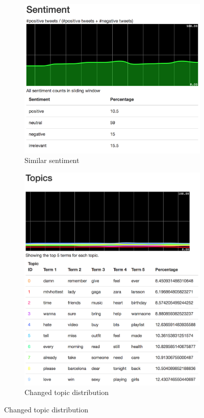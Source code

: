 \begin{figure}
    \centering
    \caption{Sample stream comparison to sample dataset}
    \label{fig:dasboard_sample}
    \begin{subfigure}[t]{0.485\textwidth}
        \centering
        \caption{Similar sentiment}
        \label{fig:sample_sentiment_distribtion_new}
        \includegraphics[width=\textwidth]{../images/dashboard_sentiment_sample.png}
    \end{subfigure}
    \begin{subfigure}[t]{0.505\textwidth}
        \centering
        \caption{Changed topic distribution}
        \label{fig:sample_topic_distribution_new}
        \includegraphics[width=\textwidth]{../images/dashboard_topics_sample.png}

\end{subfigure}
\end{figure}
